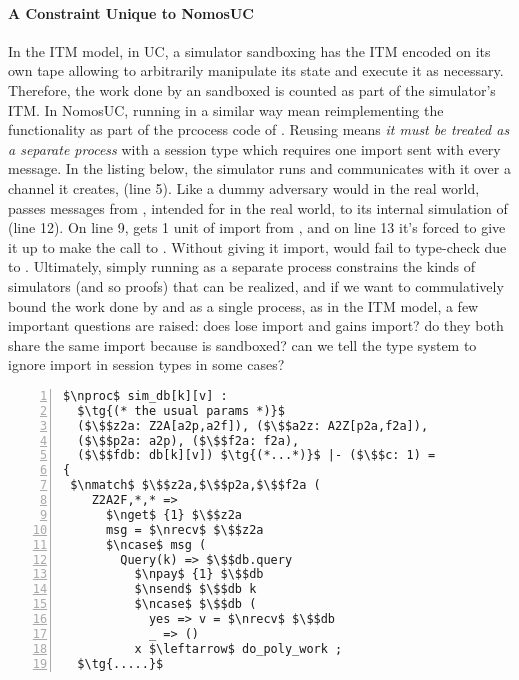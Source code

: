 \paragraph{A Constraint Unique to NomosUC}
In the ITM model, in UC, a simulator sandboxing \Fdb has the ITM encoded on its own tape allowing to arbitrarily manipulate its state and execute it as necessary.
Therefore, the work done by an sandboxed \Fdb is counted as part of the simulator's ITM.
In NomosUC, running \Fdb in a similar way mean reimplementing the functionality as part of the prcocess code of \Sim. Reusing \Fdb means \emph{it must be treated as a separate process} 
with a session type  which requires one import sent with every message.
In the listing below, the simulator runs \Fdb and communicates with it over a channel it creates,  (line 5). 
Like a dummy adversary would in the real world, \Sim passes messages from \Z, intended for \Fdb in the real world, to its internal simulation of \Fdb (line 12).
On line 9, \Sim gets 1 unit of import from \Z, and on line 13 it's forced to give it up to make the call to \Fdb.
Without giving it import, \Sim would fail to type-check due to .
Ultimately, simply running \Fdb as a separate process constrains the kinds of simulators (and so proofs) that can be realized, and if we want to commulatively bound the work done by \Fdb and \Sim as a single process, as in the ITM model, a few important questions are raised:
does \Sim lose import and \Fdb gains import? do they both share the same import because \Fdb is sandboxed? can we tell the type system to ignore import in session types in some cases?

\begin{lstlisting}[basicstyle=\scriptsize\BeraMonottFamily, frame=single, mathescape, numbers=left, xleftmargin=2em, xrightmargin=2em]
$\nproc$ sim_db[k][v] : 
  $\tg{(* the usual params *)}$
  ($\$$z2a: Z2A[a2p,a2f]), ($\$$a2z: A2Z[p2a,f2a]),
  ($\$$p2a: a2p), ($\$$f2a: f2a),
  ($\$$fdb: db[k][v]) $\tg{(*...*)}$ |- ($\$$c: 1) =
{
 $\nmatch$ $\$$z2a,$\$$p2a,$\$$f2a (
    Z2A2F,*,* =>
      $\nget$ {1} $\$$z2a
      msg = $\nrecv$ $\$$z2a
      $\ncase$ msg (
        Query(k) => $\$$db.query
          $\npay$ {1} $\$$db
          $\nsend$ $\$$db k
          $\ncase$ $\$$db (
            yes => v = $\nrecv$ $\$$db 
            _ => ()
          x $\leftarrow$ do_poly_work ;
  $\tg{.....}$
\end{lstlisting}

